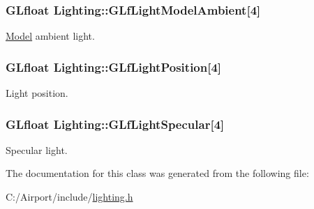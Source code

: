 \subsubsection[{\texorpdfstring{G\+Lf\+Light\+Model\+Ambient}{GLfLightModelAmbient}}]{\setlength{\rightskip}{0pt plus 5cm}G\+Lfloat Lighting\+::\+G\+Lf\+Light\+Model\+Ambient\mbox{[}4\mbox{]}\hspace{0.3cm}{\ttfamily [private]}}\hypertarget{class_lighting_adaf2dbed9918074abc9aa6baa0cb2874}{}\label{class_lighting_adaf2dbed9918074abc9aa6baa0cb2874}
\hyperlink{class_model}{Model} ambient light. 
\subsubsection[{\texorpdfstring{G\+Lf\+Light\+Position}{GLfLightPosition}}]{\setlength{\rightskip}{0pt plus 5cm}G\+Lfloat Lighting\+::\+G\+Lf\+Light\+Position\mbox{[}4\mbox{]}\hspace{0.3cm}{\ttfamily [private]}}\hypertarget{class_lighting_ac32a0644e1cf1fcbbcfd4cc9fd64dadc}{}\label{class_lighting_ac32a0644e1cf1fcbbcfd4cc9fd64dadc}
Light position. 
\subsubsection[{\texorpdfstring{G\+Lf\+Light\+Specular}{GLfLightSpecular}}]{\setlength{\rightskip}{0pt plus 5cm}G\+Lfloat Lighting\+::\+G\+Lf\+Light\+Specular\mbox{[}4\mbox{]}\hspace{0.3cm}{\ttfamily [private]}}\hypertarget{class_lighting_a931695dbe1f392f986a2a47434243f10}{}\label{class_lighting_a931695dbe1f392f986a2a47434243f10}
Specular light. 

The documentation for this class was generated from the following file\+:\begin{DoxyCompactItemize}
\item 
C\+:/\+Airport/include/\hyperlink{lighting_8h}{lighting.\+h}\end{DoxyCompactItemize}
